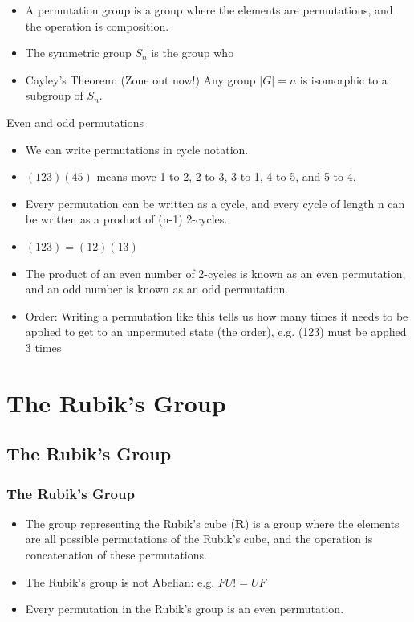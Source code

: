 \documentclass[xcolor=pdftex,dvipsnames,table]{beamer}
\begin{document}
\begin{frame}
  \begin{itemize}
    \item A permutation group is a group where the elements are permutations, and the operation is composition.
    \item The symmetric group $S_n$ is the group who
    \item Cayley's Theorem: (Zone out now!) Any group $|G|=n$ is isomorphic to a subgroup of $S_n$.
  \end{itemize}
\end{frame}

\begin{frame}
  Even and odd permutations
  \begin{itemize}
    \item We can write permutations in cycle notation. 
    \item $(123)(45)$ means move 1 to 2, 2 to 3, 3 to 1, 4 to 5, and 5 to 4.
    \item Every permutation can be written as a cycle, and every cycle of length n can be written as a product of (n-1) 2-cycles.
    \item $(123) = (12)(13)$
    \item The product of an even number of 2-cycles is known as an even permutation, and an odd number is known as an odd permutation.
    \item Order: Writing a permutation like this tells us how many times it needs to be applied to get to an unpermuted state (the order), e.g. (123) must be applied 3 times
  \end{itemize}
\end{frame}

\section{The Rubik's Group}
\subsection{The Rubik's Group}
\begin{frame}
  \frametitle{The Rubik's Group}
  \begin{itemize}
    \item The group representing the Rubik's cube ($ \mathbf{R} $) is a group where the elements are all possible permutations of the Rubik's cube, and the operation is concatenation of these permutations.
    \item The Rubik's group is not Abelian: e.g. $FU != UF$
    \item Every permutation in the Rubik's group is an even permutation.
  \end{itemize}
\end{frame}
\end{document}

